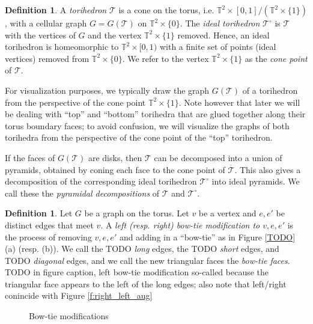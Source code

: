 \documentclass[11pt]{amsart}
\newcommand{\torus}{{\mathbb{T}^2}}
\newcommand{\sT}{{\mathcal{T}}}
\theoremstyle{plain}
\theoremstyle{definition}
\newtheorem{define}[theorem]{Definition}
\newtheorem{definition}[theorem]{Definition}
\begin{document}
\begin{define}\cite{CKP2}
\label{def:torihedron}
A \emph{torihedron} $\sT$ is a cone on the torus, 
i.e. $\torus \times [0,1]/(\torus \times \{1\})$, with a cellular graph
$G = G(\sT)$ on $\torus \times \{0\}$.
The \emph{ideal torihedron} $\sT^\circ$ is $\sT$ with the
vertices of $G$ and the vertex $\torus \times \{1\}$ removed. Hence, an ideal
torihedron is homeomorphic to $\torus \times [0,1)$ with a finite set of points
(ideal vertices) removed from $\torus \times \{0\}$.
We refer to the vertex $\torus \times \{1\}$ as the \emph{cone point}
of $\sT$.
\end{define}


For visualization purposes, we typically draw the graph $G(\sT)$ of a
torihedron from the perspective of the cone point $\torus \times \{1\}$.
Note however that later we will be dealing with
``top'' and ``bottom'' torihedra that are glued together
along their torus boundary faces;
to avoid confusion, we will visualize the graphs of both torihedra
from the perspective of the cone point of the ``top'' torihedron.


If the faces of $G(\sT)$ are disks,
then $\sT$ can be decomposed into a union of pyramids,
obtained by coning each face to the cone point of $\sT$.
This also gives a decomposition of the corresponding ideal torihedron
$\sT^\circ$ into ideal pyramids.
We call these the \emph{pyramidal decompositions} of $\sT$ and $\sT^\circ$.


\begin{definition}
Let $G$ be a graph on the torus.
Let $v$ be a vertex and $e,e'$ be distinct edges that meet $v$.
A \emph{left (resp. right) bow-tie modification to $v,e,e'$}
is the process of removing $v,e,e'$ and adding in a ``bow-tie''
as in Figure \ref{TODO} (a) (resp. (b)).
We call the TODO \emph{long} edges, the TODO \emph{short} edges,
and TODO \emph{diagonal} edges,
and we call the new triangular faces the \emph{bow-tie faces}.
TODO in figure caption, left bow-tie modification so-called because
the triangular face appears to the left of the long edges;
also note that left/right conincide with Figure \ref{f:right_left_aug}


\begin{figure}[ht]

\caption{Bow-tie modifications}
\label{f:bow-tie-modification}
\end{figure}


\label{d:diagram-bowtie}
\end{definition}
\end{document}
